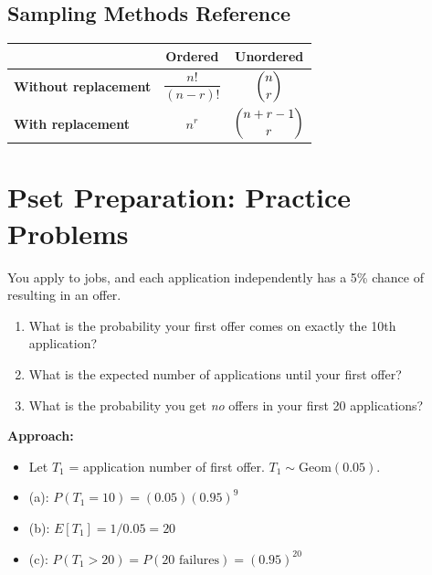 \documentclass[11pt]{article}
\begin{document}
\subsection{Sampling Methods Reference}

\renewcommand{\arraystretch}{1.3}
\begin{center}
\begin{tabular}{@{}lcc@{}}
\toprule
& \textbf{Ordered} & \textbf{Unordered} \\
\midrule
\textbf{Without replacement} & $\dfrac{n!}{(n-r)!}$ & $\dbinom{n}{r}$ \\[12pt]
\textbf{With replacement} & $n^r$ & $\dbinom{n+r-1}{r}$ \\[8pt]
\bottomrule
\end{tabular}
\end{center}

\section{Pset Preparation: Practice Problems}

\begin{practicebox}
You apply to jobs, and each application independently has a 5\% chance of resulting in an offer.
\begin{enumerate}[label=(\alph*), nosep]
  \item What is the probability your first offer comes on exactly the 10th application?
  \item What is the expected number of applications until your first offer?
  \item What is the probability you get \emph{no} offers in your first 20 applications?
\end{enumerate}
\end{practicebox}

\textbf{Approach:}
\begin{itemize}[nosep]
  \item Let $T_1$ = application number of first offer. $T_1 \sim \text{Geom}(0.05)$.
  \item (a): $P(T_1 = 10) = (0.05)(0.95)^{9}$
  \item (b): $E[T_1] = 1/0.05 = 20$
  \item (c): $P(T_1 > 20) = P(\text{20 failures}) = (0.95)^{20}$
\end{itemize}
\end{document}
